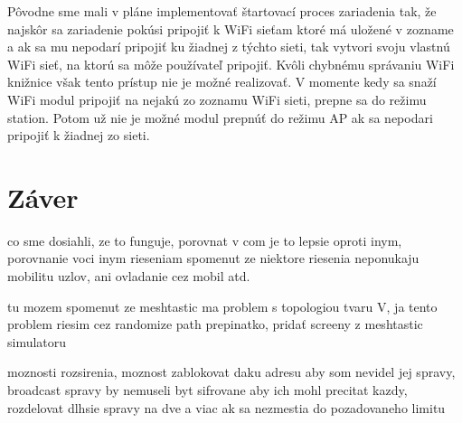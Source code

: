 \documentclass[slovak,master]{diploma}
\begin{document}
Pôvodne sme mali v pláne implementovať štartovací proces zariadenia tak, že najskôr sa zariadenie pokúsi pripojiť k WiFi sieťam ktoré má uložené v zozname a ak sa mu nepodarí 
pripojiť ku žiadnej z týchto sieti, tak vytvori svoju vlastnú WiFi sieť, na ktorú sa môže používateľ pripojiť. Kvôli chybnému správaniu WiFi knižnice však tento prístup nie je možné 
realizovať. V momente kedy sa snaží WiFi modul pripojiť na nejakú zo zoznamu WiFi sieti, prepne sa do režimu station. Potom už nie je možné modul prepnúť do režimu AP ak sa nepodari pripojiť 
k žiadnej zo sieti.

\chapter{Záver}
co sme dosiahli, ze to funguje, porovnat v com je to lepsie oproti inym, porovnanie voci inym rieseniam
spomenut ze niektore riesenia neponukaju mobilitu uzlov, ani ovladanie cez mobil atd.

tu mozem spomenut ze meshtastic ma problem s topologiou tvaru V, ja tento problem riesim cez randomize path prepinatko, pridať screeny z meshtastic simulatoru

moznosti rozsirenia, moznost zablokovat daku adresu aby som nevidel jej spravy, broadcast spravy by nemuseli byt sifrovane aby ich mohl precitat kazdy,
rozdelovat dlhsie spravy na dve a viac ak sa nezmestia do pozadovaneho limitu




\printbibliography[title={Literatura}, heading=bibintoc]

%

%
\end{document}
